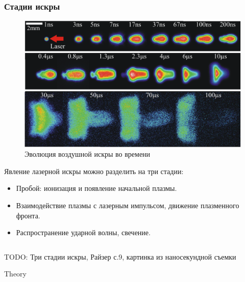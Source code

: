 \documentclass{beamer}
\begin{document}
	\begin{frame}
		\frametitle{Стадии искры}
		\begin{figure}
			\centering
			\captionsetup{justification=centering}
			\includegraphics[width=0.8\linewidth]{res/spark_evolution.png}
			\caption*{Эволюция воздушной искры во времени}
		\end{figure}
		\vspace{-5pt}
		Явление лазерной искры можно разделить на три стадии:
		\begin{itemize}
			\item Пробой: ионизация и появление начальной плазмы.
			\item Взаимодействие плазмы с лазерным импульсом, движение плазменного фронта.
			\item Распространение ударной волны, свечение.
		\end{itemize}
		
		
		\begin{columns}
			
		\end{columns}
		TODO: Три стадии искры, Райзер с.9, картинка из наносекундной съемки
	\end{frame}
	
	
	\begin{frame}[plain,c]
		
		\begin{center}
			\huge \usebeamercolor[fg]{frametitle} Theory
		\end{center}
		
	\end{frame}
	
\end{document}
